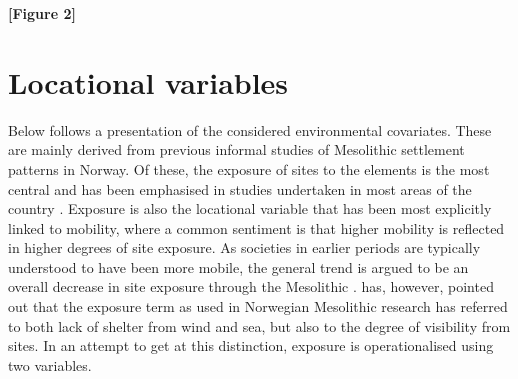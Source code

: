 \documentclass[12pt, a4paper]{article}
\begin{document}
\smallskip
\textbf{[Figure 2]}
\smallskip

\section{Locational variables}
Below follows a presentation of the considered environmental covariates. These are mainly derived from previous informal studies of Mesolithic settlement patterns in Norway. Of these, the exposure of sites to the elements is the most central and has been emphasised in studies undertaken in most areas of the country \citep[][]{bjerck2008, berghansen2009, aastveit2014}. Exposure is also the locational variable that has been most explicitly linked to mobility, where a common sentiment is that higher mobility is reflected in higher degrees of site exposure. As societies in earlier periods are typically understood to have been more mobile, the general trend is argued to be an overall decrease in site exposure through the Mesolithic \citep[e.g.][]{lindblom1984, jaksland2001, bjerck2008, breivik2018}. \cite{svendsen2014} has, however, pointed out that the exposure term as used in Norwegian Mesolithic research has referred to both lack of shelter from wind and sea, but also to the degree of visibility from sites. In an attempt to get at this distinction, exposure is operationalised using two variables. \par
\end{document}
